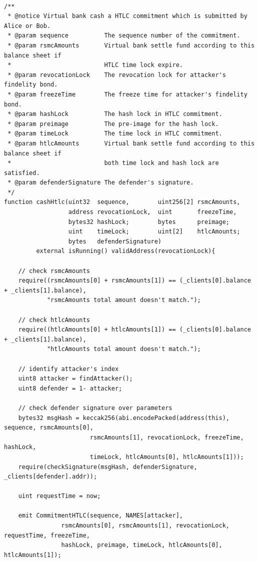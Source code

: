 \begin{lstlisting}[caption={兑现RSMC共同承诺}, label={lst:cashHtlc}]

/**
 * @notice Virtual bank cash a HTLC commitment which is submitted by Alice or Bob.
 * @param sequence          The sequence number of the commitment.
 * @param rsmcAmounts       Virtual bank settle fund according to this balance sheet if 
 *                          HTLC time lock expire.
 * @param revocationLock    The revocation lock for attacker's findelity bond.
 * @param freezeTime        The freeze time for attacker's findelity bond.
 * @param hashLock          The hash lock in HTLC commitment.
 * @param preimage          The pre-image for the hash lock.
 * @param timeLock          The time lock in HTLC commitment.
 * @param htlcAmounts       Virtual bank settle fund according to this balance sheet if 
 *                          both time lock and hash lock are satisfied.
 * @param defenderSignature The defender's signature.
 */
function cashHtlc(uint32  sequence,        uint256[2] rsmcAmounts, 
                  address revocationLock,  uint       freezeTime, 
                  bytes32 hashLock;        bytes      preimage;
                  uint    timeLock;        uint[2]    htlcAmounts;
                  bytes   defenderSignature) 
         external isRunning() validAddress(revocationLock){

    // check rsmcAmounts
    require((rsmcAmounts[0] + rsmcAmounts[1]) == (_clients[0].balance + _clients[1].balance), 
            "rsmcAmounts total amount doesn't match.");
    
    // check htlcAmounts
    require((htlcAmounts[0] + htlcAmounts[1]) == (_clients[0].balance + _clients[1].balance), 
            "htlcAmounts total amount doesn't match.");
    
    // identify attacker's index
    uint8 attacker = findAttacker();
    uint8 defender = 1- attacker;
    
    // check defender signature over parameters
    bytes32 msgHash = keccak256(abi.encodePacked(address(this), sequence, rsmcAmounts[0], 
                        rsmcAmounts[1], revocationLock, freezeTime, hashLock, 
                        timeLock, htlcAmounts[0], htlcAmounts[1]));
    require(checkSignature(msgHash, defenderSignature, _clients[defender].addr));
    
    uint requestTime = now;
    
    emit CommitmentHTLC(sequence, NAMES[attacker], 
                rsmcAmounts[0], rsmcAmounts[1], revocationLock, requestTime, freezeTime,
                hashLock, preimage, timeLock, htlcAmounts[0], htlcAmounts[1]);
    

\end{lstlisting}
